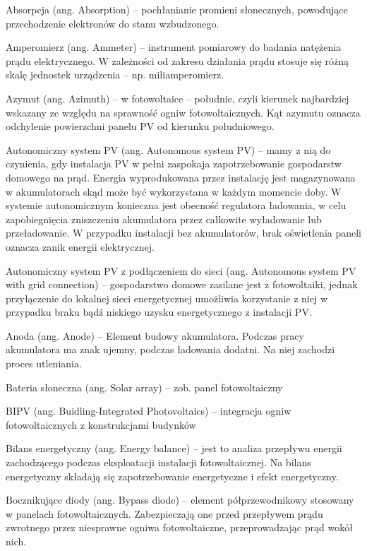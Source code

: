 \documentclass[12pt,a4paper]{article}
\begin{document}
Absorpcja (ang. Absorption) – pochłanianie promieni słonecznych, powodujące przechodzenie elektronów do stanu wzbudzonego.

Amperomierz (ang. Ammeter) – instrument pomiarowy do badania natężenia prądu elektrycznego. W zależności od zakresu działania prądu stosuje się różną skalę jednostek urządzenia – np. miliamperomierz.

Azymut (ang. Azimuth) – w fotowoltaice – południe, czyli kierunek najbardziej wskazany ze względu na sprawność ogniw fotowoltaicznych. Kąt azymutu oznacza odchylenie powierzchni panelu PV od kierunku południowego.

Autonomiczny system PV (ang. Autonomous system PV) – mamy z nią do czynienia, gdy instalacja PV w pełni zaspokaja zapotrzebowanie gospodarstw domowego na prąd. Energia wyprodukowana przez instalację jest magazynowana w akumulatorach skąd może być wykorzystana w każdym momencie doby. W systemie autonomicznym konieczna jest obecność regulatora ładowania, w celu zapobiegnięcia zniszczeniu akumulatora przez całkowite wyładowanie lub przeładowanie. W przypadku instalacji bez akumulatorów, brak oświetlenia paneli oznacza zanik energii elektrycznej.

Autonomiczny system PV z podłączeniem do sieci (ang. Autonomous system PV with grid connection) – gospodarstwo domowe zasilane jest z fotowoltaiki, jednak przyłączenie do lokalnej sieci energetycznej umożliwia korzystanie z niej w przypadku braku bądź niskiego uzysku energetycznego z instalacji PV.

Anoda (ang. Anode) – Element budowy akumulatora. Podczas pracy akumulatora ma znak ujemny, podczas ładowania dodatni. Na niej zachodzi proces utleniania.


Bateria słoneczna (ang. Solar array) – zob. panel fotowoltaiczny

BIPV (ang. Buidling-Integrated Photovoltaics) – integracja ogniw fotowoltaicznych z konstrukcjami budynków

Bilans energetyczny (ang. Energy balance) – jest to analiza przepływu energii zachodzącego podczas eksploatacji instalacji fotowoltaicznej.  Na bilans energetyczny składają się zapotrzebowanie energetyczne i efekt energetyczny.

Bocznikujące diody (ang. Bypass diode) – element półprzewodnikowy stosowany w panelach fotowoltaicznych. Zabezpieczają one przed przepływem prądu zwrotnego przez niesprawne ogniwa fotowoltaiczne, przeprowadzając prąd wokół nich.
\end{document}
